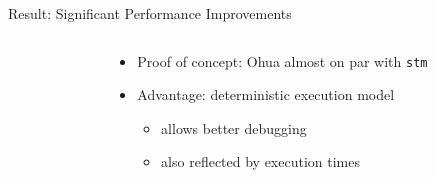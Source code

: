 \documentclass[aspectratio=169, usenames, dvipsnames]{beamer}
\begin{document}
\begin{frame}{Result: Significant Performance Improvements}
  \begin{columns}
    \begin{column}{0.55\textwidth}
      \centering
    \end{column}
    \begin{column}{0.45\textwidth}
      \begin{itemize}
        \item<2-> Proof of concept: Ohua almost on par with \alert{\texttt{stm}}
        \item<3-> Advantage: deterministic execution model
        \begin{itemize}
          \item<3-> allows better debugging
          \item<5-> also reflected by execution times
        \end{itemize}
      \end{itemize}
    \end{column}
  \end{columns}
\end{frame}
\end{document}
